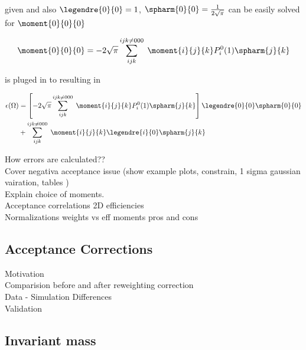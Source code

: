 \noindent given  and also $\legendre{0}{0}=1$,  $\spharm{0}{0} = \frac{1}{2\sqrt{\pi}}$  can be easily solved for $\moment{0}{0}{0}$

\begin{center}
\begin{equation}
  \moment{0}{0}{0} = -2\sqrt{\pi} \sum_{ijk}^{ijk\neq 000} \; \moment{i}{j}{k} P_i^0(1) \spharm{j}{k}
  \label{eff_func_constr}
\end{equation}
\end{center}

\noindent {} is pluged in to  resulting in \equref{}

\begin{center}
\begin{align}
  \epsilon(\Omega) &= \left[-2\sqrt{\pi} \sum_{ijk}^{ijk\neq 000} \; \moment{i}{j}{k} P_i^0(1) \spharm{j}{k} \right] \legendre{0}{0} \spharm{0}{0} \\ 
                   &+ \sum_{ijk}^{ijk\neq 000} \; \moment{i}{j}{k} \legendre{i}{0} \spharm{j}{k} \\
  \label{eff_func_final}
\end{align}
\end{center}

How errors are calculated??\\
Cover negativa acceptance issue (show example plots, constrain, 1 sigma gaussian vairation, tables )\\
Explain choice of moments.\\
Acceptance correlations 2D efficiencies\\
Normalizations weights vs eff moments pros and cons \\

\subsection{Acceptance Corrections}
\label{Accceptance_Corrections}
Motivation\\
Comparision before and after reweighting correction\\
Data - Simulation Differences\\
Validation\\

\subsection{\Kpi Invariant mass}
\label{Kpi_Invariant_mass}

